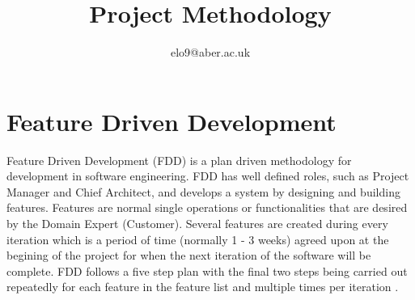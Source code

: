 \documentclass{article}
\title{Project Methodology}
\author{elo9@aber.ac.uk}
\begin{document}
\maketitle
\tableofcontents

\newpage

\section{Feature Driven Development}
Feature Driven Development (FDD) is a plan driven methodology for development in software engineering. FDD has well defined roles, such as Project Manager and Chief Architect, and develops a system by designing and building features. Features are normal single operations or functionalities that are desired by the Domain Expert (Customer). Several features are created during every iteration which is a period of time (normally 1 - 3 weeks) agreed upon at the begining of the project for when the next iteration of the software will be complete. FDD follows a five step plan with the final two steps being carried out repeatedly for each feature in the feature list and multiple times per iteration \cite{FDDandAgile}.
\end{document}

